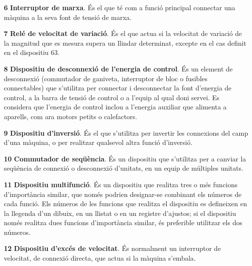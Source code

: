 \begin{multicols}{2}
\begin{list}{}
\item[\textbf{6}]  
\textbf{Interruptor de marxa}. És
el que té com a funció principal connectar una màquina a la seva font de tensió de marxa.

\item[\textbf{7}]    
\textbf{Relé de velocitat de variació}. És el que
actua si la velocitat de variació de la magnitud que es mesura supera un llindar determinat, excepte en el cas definit en el dispositiu 63.

\item[\textbf{8}]   
\textbf{Dispositiu de desconnexió de l'energia de control}. És un element de desconnexió (commutador de ganiveta,
interruptor de bloc o fusibles connectables) que s'utilitza per
connectar i desconnectar la font d'energia de control,  a la barra
de tensió de control o a l'equip al qual doni servei. Es considera
que l'energia de control inclou a l'energia auxiliar que alimenta a
aparells, com ara motors petits o calefactors.

\item[\textbf{9}]   
\textbf{Dispositiu d'inversió}. És el
que s'utilitza per invertir les connexions del camp d'una màquina, o
per realitzar qualsevol altra funció  d'inversió.

\item[\textbf{10}]   
\textbf{Commutador de seqüència}. És un
dispositiu que s'utilitza per a canviar la seqüència de connexió o
desconnexió d'unitats, en un equip de múltiples unitats.


\item[\textbf{11}]  
\textbf{Dispositiu multifunció}. És un dispositiu que realitza tres o més funcions d'importància similar, que només podrien designar-se combinant els números de cada funció. Els números de les funcions que realitza el dispositiu es defineixen en la llegenda d'un dibuix, en un llistat o en un registre d'ajustos; si el dispositiu només realitza dues funcions d'importància similar, és preferible utilitzar els dos números.

\item[\textbf{12}]   
\textbf{Dispositiu d'excés de velocitat}. És normalment un
interruptor de velocitat, de connexió directa, que actua si la màquina  s'embala.


\end{list}
\end{multicols}

